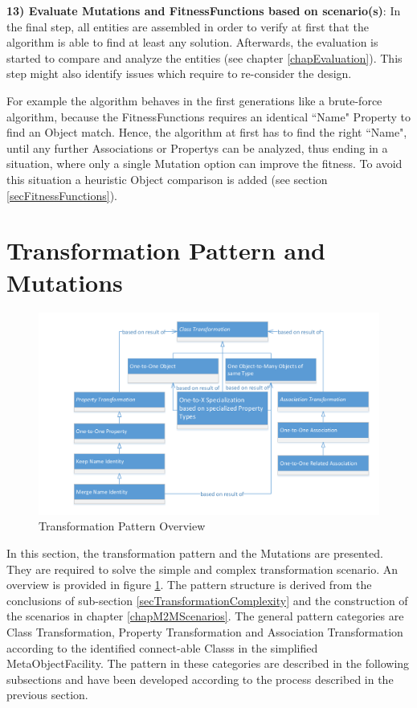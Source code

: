 \textbf{13) Evaluate \glspl{Mutation} and \glspl{FitnessFunction} based on scenario(s)}: In the final step, all entities are assembled in order to verify at first that the algorithm is able to find at least any solution. Afterwards, the evaluation is started to compare and analyze the entities (see chapter \ref{chapEvaluation}). This step might also identify issues which require to re-consider the design.

For example the algorithm behaves in the first generations like a brute-force algorithm, because the \glspl{FitnessFunction} requires an identical ``Name" \gls{Property} to find an \gls{Object} match. Hence, the algorithm at first has to find the right ``Name", until any further \glspl{Association} or \glspl{Property} can be analyzed, thus ending in a situation, where only a single \gls{Mutation} option can improve the fitness. To avoid this situation a heuristic \gls{Object} comparison is added (see section \ref{secFitnessFunctions}).

\section{Transformation Pattern and Mutations}
\label{secPatternAndMutations}

\begin{figure}[htb]
	\centering
	\includegraphics[scale=0.6, trim=0cm 0cm 0cm 0cm, clip=true]{Images/TransformationPattern_Overview.pdf} 
	\caption{Transformation Pattern Overview}
	\label{figTransformationPattern_Overview}
\end{figure}

In this section, the transformation pattern and the \glspl{Mutation} are presented. They are required to solve the simple and complex transformation scenario. An overview is provided in figure \ref{figTransformationPattern_Overview}. The pattern structure is derived from the conclusions of sub-section \ref{secTransformationComplexity} and the construction of the scenarios in chapter \ref{chapM2MScenarios}. The general pattern categories are \Gls{Class} Transformation, \Gls{Property} Transformation and \Gls{Association} Transformation according to the identified connect-able \glspl{Class} in the simplified \gls{MetaObjectFacility}. The pattern in these categories are described in the following subsections and have been developed according to the process described in the previous section.

